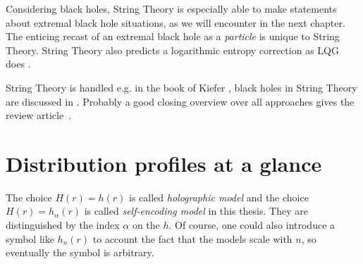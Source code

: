 \documentclass[12pt,a4paper]{report}
\numberwithin{equation}{chapter}
\begin{document}
\begin{appendices}
Considering black holes, String Theory is especially able to make statements about extremal black hole situations, as we will encounter in the next chapter. The enticing recast of an extremal black hole as a \emph{particle} is unique to String Theory. String Theory also predicts a logarithmic entropy correction as LQG does \cite{Susskind94}.

String Theory is handled e.g. in the book of Kiefer \cite{kieferBook}, black holes in String Theory are discussed in \cite{Maldacena1996}. Probably a good closing overview over all approaches gives the review article~\cite{Kiefer2005}.
%
%

\chapter{Distribution profiles at a glance} \label{sec:apx-H}

The choice $H(r)=h(r)$ is called \emph{holographic model} and the choice $H(r)=h_\alpha(r)$ is called \emph{self-encoding model} in this thesis.
They are distinguished by the index $\alpha$ on the $h$. Of course, one could also introduce a symbol like $h_n(r)$ to account the fact that
the models scale with $n$, so eventually the symbol is arbitrary.


\end{appendices}
\end{document}
